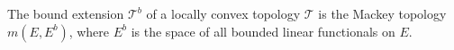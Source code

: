 The bound extension $\mathcal{T}^{b}$ of a locally convex topology $\mathcal{T}$ is the Mackey topology $m(E, E^{b})$, where $E^{b}$ is the space of all bounded linear functionals on $E$.
